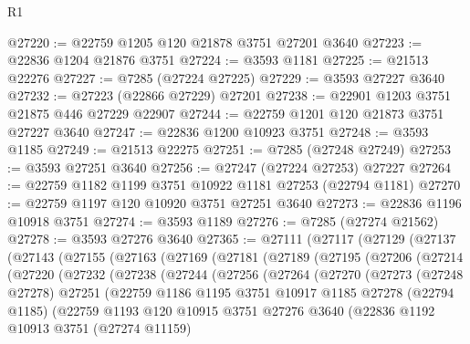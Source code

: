 \begin{lexlean}{R1}
\begin{coremodule}
@27220 := @22759 @1205 @120 @21878 @3751 @27201 @3640
@27223 := @22836 @1204 @21876 @3751
@27224 := @3593 @1181
@27225 := @21513 @22276
@27227 := @7285 (@27224 @27225)
@27229 := @3593 @27227 @3640
@27232 := @27223 (@22866 @27229) @27201
@27238 := @22901 @1203 @3751 @21875 @446 @27229 @22907
@27244 := @22759 @1201 @120 @21873 @3751 @27227 @3640
@27247 := @22836 @1200 @10923 @3751
@27248 := @3593 @1185
@27249 := @21513 @22275
@27251 := @7285 (@27248 @27249)
@27253 := @3593 @27251 @3640
@27256 := @27247 (@27224 @27253) @27227
@27264 := @22759 @1182 @1199 @3751 @10922 @1181 @27253 (@22794 @1181)
@27270 := @22759 @1197 @120 @10920 @3751 @27251 @3640
@27273 := @22836 @1196 @10918 @3751
@27274 := @3593 @1189
@27276 := @7285 (@27274 @21562)
@27278 := @3593 @27276 @3640
@27365 := @27111
    (@27117
      (@27129
        (@27137
          (@27143
            (@27155
              (@27163
                (@27169
                  (@27181
                    (@27189
                      (@27195
                        (@27206
                          (@27214
                            (@27220
                              (@27232
                                (@27238
                                  (@27244
                                    (@27256
                                      (@27264
                                        (@27270
                                          (@27273
                                            (@27248 @27278)
                                            @27251
                                            (@22759
                                              @1186
                                              @1195
                                              @3751
                                              @10917
                                              @1185
                                              @27278
                                              (@22794 @1185)
                                              (@22759
                                                @1193
                                                @120
                                                @10915
                                                @3751
                                                @27276
                                                @3640
                                                (@22836
                                                  @1192
                                                  @10913
                                                  @3751
                                                  (@27274 @11159)

\end{coremodule}
\end{lexlean}
